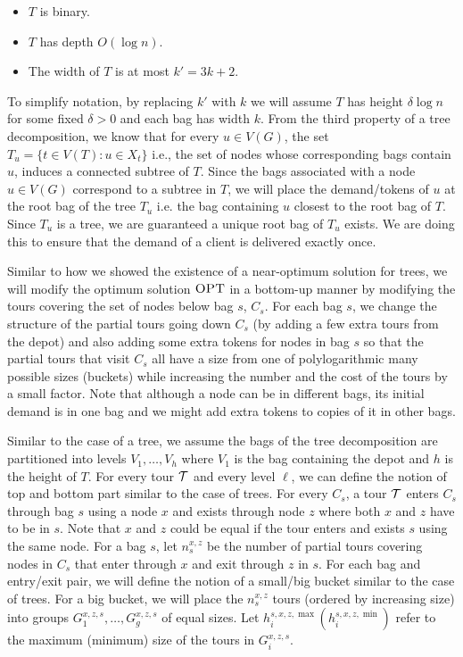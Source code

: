 \documentclass[twoside,leqno]{article}
\newcommand{\calT}{{\cal T}}
\newcommand{\OPT}{\mbox{\sc OPT}}
\begin{document}
\begin{itemize}
    \item $T$ is binary.
    \item $T$ has depth $O(\log n)$.
    \item The width of $T$ is at most $k'=3k + 2$.
\end{itemize}
To simplify  notation, by replacing $k'$ with $k$
we will assume $T$ has height $\delta \log n$ for some fixed $\delta > 0$ and each bag has width $k$. From the third property of a tree decomposition, we know that for every $u \in V(G)$, the set $T_u = \{t \in V(T) : u \in X_t \}$ i.e., the set of nodes whose corresponding bags contain $u$, induces a connected subtree of $T$. Since the bags associated with a node $u \in V(G)$ correspond to a subtree in $T$, we will place the demand/tokens of $u$ at the root bag of the tree $T_u$ i.e. the bag containing $u$ closest to the root bag of $T$. Since $T_u$ is a tree, we are guaranteed a unique root bag of $T_u$ exists. We are doing this to ensure that the demand of a client is delivered exactly once.

Similar to how we showed the existence of a near-optimum solution for trees, we will modify the optimum solution $\OPT$ in a bottom-up manner by modifying the tours covering the set of nodes below bag $s$, $C_s$. For each bag $s$, we change the structure of the partial tours going down $C_s$ (by adding a few extra tours from the depot) and also adding some extra tokens for nodes in bag $s$ so that the partial tours that visit $C_s$ all have a size from one of polylogarithmic many possible sizes (buckets) while increasing the number and the cost of the tours by a small factor. Note that although a node can be in different bags, its initial demand is in one bag and we might add extra tokens to copies of it in other bags.

Similar to the case of a tree, we assume the bags of the tree decomposition are partitioned into levels $V_1,\ldots,V_h$ where $V_1$ is the bag containing the depot and $h$ is the height of $T$.  For every tour $\calT$ and every level $\ell$, we can define the notion of top and bottom part similar to the case of trees. For every $C_s$, a tour $\calT$ enters $C_s$ through bag $s$ using a node $x$ and exists through node $z$ where both $x$ and $z$ have to be in $s$. Note that $x$ and $z$ could be equal if the tour enters and exists $s$ using the same node. For a bag $s$, let $n_{s}^{x,z}$ be the number of partial tours covering nodes in $C_s$ that enter through $x$ and exit through $z$ in $s$. For each bag and entry/exit pair, we will define the notion of a small/big bucket similar to the case of trees. For a big bucket, we will place the $n_{s}^{x,z}$ tours (ordered by increasing size) into groups $G_1^{x,z,s}, \ldots, G_g^{x,z,s}$ of equal sizes. Let $h_{i}^{s,x,z, \max} (h_{i}^{s,x,z, \min}) $ refer to the maximum (minimum) size of the tours in $G^{x,z,s}_i$.
\end{document}
